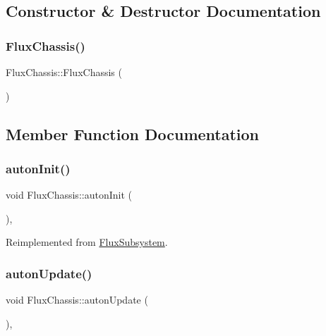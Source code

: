 \subsection{Constructor \& Destructor Documentation}
\mbox{\label{classFluxChassis_a5f66d5b8ea384c006de49dfb602fdec8}} 
\subsubsection{\texorpdfstring{Flux\+Chassis()}{FluxChassis()}}
{\footnotesize\ttfamily Flux\+Chassis\+::\+Flux\+Chassis (\begin{DoxyParamCaption}{ }\end{DoxyParamCaption})}



\subsection{Member Function Documentation}
\mbox{\label{classFluxChassis_acdfad6bb4b5cc6e5c03e8e8ab5879c52}} 
\subsubsection{\texorpdfstring{auton\+Init()}{autonInit()}}
{\footnotesize\ttfamily void Flux\+Chassis\+::auton\+Init (\begin{DoxyParamCaption}{ }\end{DoxyParamCaption})\hspace{0.3cm}{\ttfamily [override]}, {\ttfamily [virtual]}}



Reimplemented from \hyperlink{classFluxSubsystem_a142cb34f612412e26bd0049e037dbe60}{Flux\+Subsystem}.

\mbox{\label{classFluxChassis_a2298a26f376a4b7d73da84f33b68642e}} 
\subsubsection{\texorpdfstring{auton\+Update()}{autonUpdate()}}
{\footnotesize\ttfamily void Flux\+Chassis\+::auton\+Update (\begin{DoxyParamCaption}{ }\end{DoxyParamCaption})\hspace{0.3cm}{\ttfamily [override]}, {\ttfamily [virtual]}}




